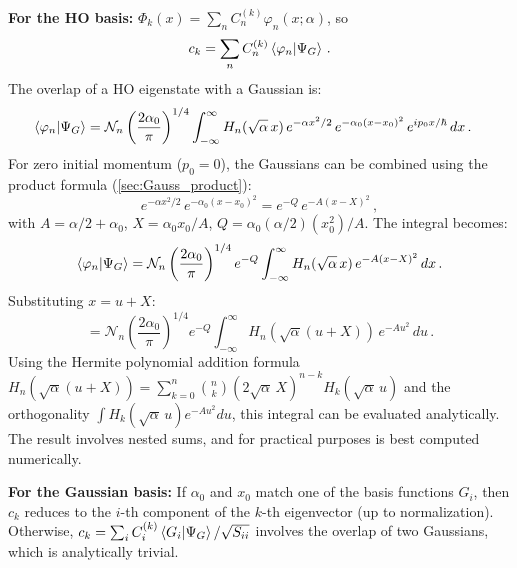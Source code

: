 \textbf{For the HO basis:} $\Phi_k(x) = \sum_n C_n^{(k)}\varphi_n(x;\alpha)$, so
\begin{equation}
  c_k = \sum_n C_n^{(k)}\braket{\varphi_n}{\Psi_G}\,.
\end{equation}
The overlap of a HO eigenstate with a Gaussian is:
\begin{align}
  \braket{\varphi_n}{\Psi_G}
  &= \mathcal{N}_n\left(\frac{2\alpha_0}{\pi}\right)^{1/4}
  \int_{-\infty}^{\infty}H_n(\sqrt{\alpha}\,x)\,e^{-\alpha x^2/2}\,e^{-\alpha_0(x-x_0)^2}\,e^{ip_0 x/\hbar}\,dx\,.
\end{align}
For zero initial momentum ($p_0 = 0$), the Gaussians can be combined using the
product formula (\cref{sec:Gauss_product}):
\begin{equation}
  e^{-\alpha x^2/2}\,e^{-\alpha_0(x-x_0)^2}
  = e^{-Q}\,e^{-A(x-X)^2}\,,
\end{equation}
with $A = \alpha/2 + \alpha_0$, $X = \alpha_0 x_0/A$, $Q = \alpha_0(\alpha/2)(x_0^2)/A$.
The integral becomes:
\begin{equation}
  \braket{\varphi_n}{\Psi_G} = \mathcal{N}_n\left(\frac{2\alpha_0}{\pi}\right)^{1/4}e^{-Q}
  \int_{-\infty}^{\infty}H_n(\sqrt{\alpha}\,x)\,e^{-A(x-X)^2}\,dx\,.
\end{equation}
Substituting $x = u + X$:
\begin{equation}
  = \mathcal{N}_n\left(\frac{2\alpha_0}{\pi}\right)^{1/4}e^{-Q}
  \int_{-\infty}^{\infty}H_n(\sqrt{\alpha}(u+X))\,e^{-Au^2}\,du\,.
\end{equation}
Using the Hermite polynomial addition formula
$H_n(\sqrt{\alpha}(u+X)) = \sum_{k=0}^{n}\binom{n}{k}(2\sqrt{\alpha}\,X)^{n-k}H_k(\sqrt{\alpha}\,u)$
and the orthogonality $\int H_k(\sqrt{\alpha}\,u)e^{-Au^2}du$, this integral can be
evaluated analytically. The result involves nested sums, and for practical purposes
is best computed numerically.

\textbf{For the Gaussian basis:} If $\alpha_0$ and $x_0$ match one of the basis
functions $G_i$, then $c_k$ reduces to the $i$-th component of the $k$-th eigenvector
(up to normalization). Otherwise, $c_k = \sum_i C_i^{(k)}\braket{G_i}{\Psi_G}/\sqrt{S_{ii}}$
involves the overlap of two Gaussians, which is analytically trivial.

